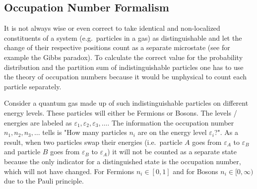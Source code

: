 \documentclass[a4paper,10pt]{article}
\numberwithin{equation}{section}
\begin{document}
\begin{multicols}{2}
\subsection{Occupation Number Formalism}
It is not always wise or even correct to take identical and non-localized constituents of a system (e.g.\ particles in a gas) as distinguishable and let the change of their respective positions count as a separate microstate (see for example the Gibbs paradox).
To calculate the correct value for the probability distribution and the partition sum of indistinguishable particles one has to use the theory of occupation numbers because it would be unphysical to count each particle separately.

Consider a quantum gas made up of such indistinguishable particles on different energy levels.
These particles will either be Fermions or Bosons.
The levels / energies are labeled as $\varepsilon _1,\varepsilon _2,\varepsilon _3,\hdots $.
The information the occupation number $n_1,n_2,n_3,\hdots $ tells is "How many particles $n_i$ are on the energy level $\varepsilon _i$?".
As a result, when two particles swap their energies (i.e.\ particle $A$ goes from $\varepsilon _A$ to $\varepsilon _B$ and particle $B$ goes from $\varepsilon _B$ to $\varepsilon _A$) it will not be counted as a separate state because the only indicator for a distinguished state is the occupation number, which will not have changed.
For Fermions $n_i  \in \left[0,1\right]$ and for Bosons $n_i  \in [0,\infty)$ due to the Pauli principle.


\end{multicols}
\end{document}
